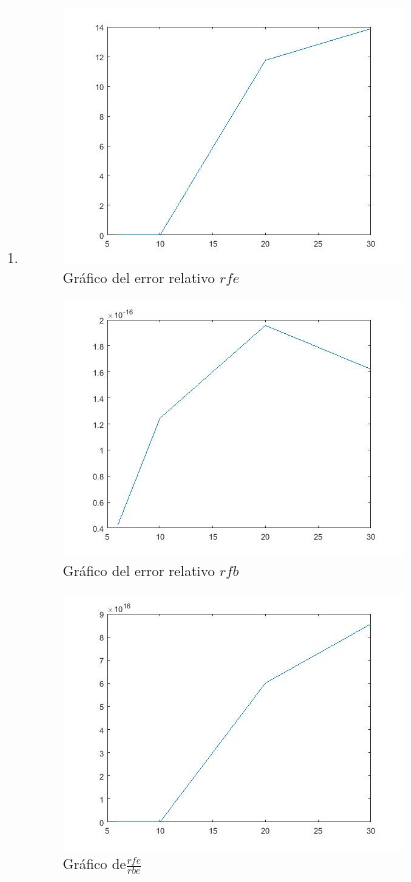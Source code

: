 \documentclass{udpreport}
\begin{document}
\begin{enumerate}
\begin{enumerate}
 			\item 
 			\begin{figure}[H]
 				\centering
 				\includegraphics[width=9cm]{grafo1-rfe}
 				\caption{Gráfico del error relativo $rfe$}	
 			\end{figure}
 			
 			\begin{figure}[H]
 				\centering
 				\includegraphics[width=9cm]{grafo1-rbe}
 				\caption{Gráfico del error relativo $rfb$}		
 			\end{figure}
 			
 			\begin{figure}[H]
 				\centering
 				\includegraphics[width=9cm]{grafo1-div}
 				\caption{Gráfico de$\frac{rfe}{rbe}$}
	

\end{figure}
\end{enumerate}
\end{enumerate}
\end{document}
